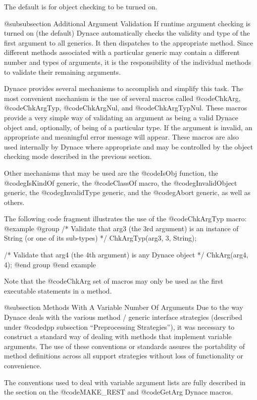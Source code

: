 The default is for object checking to be turned on.


@subsubsection Additional Argument Validation
If runtime argument checking is turned on (the default) Dynace
automatically checks the validity and type of the first argument to all
generics.  It then dispatches to the appropriate method.  Since
different methods associated with a particular generic may contain a
different number and types of arguments, it is the responsibility of the
individual methods to validate their remaining arguments.

Dynace provides several mechanisms to accomplish and simplify this task.
The most convenient mechanism is the use of several macros called
@code{ChkArg}, @code{ChkArgTyp}, @code{ChkArgNul}, and
@code{ChkArgTypNul}.  These macros provide a very simple way of
validating an argument as being a valid Dynace object and, optionally,
of being of a particular type.  If the argument is invalid, an
appropriate and meaningful error message will appear.  These macros are
also used internally by Dynace where appropriate and may be controlled
by the object checking mode described in the previous section.

Other mechanisms that may be used are the @code{IsObj} function, the
@code{gIsKindOf} generic, the @code{ClassOf} macro, the
@code{gInvalidObject} generic, the @code{gInvalidType} generic, and the
@code{gAbort} generic, as well as others.

The following code fragment illustrates the use of the @code{ChkArgTyp}
macro:
@example
@group
/*  Validate that arg3 (the 3rd argument) is an instance of String
    (or one of its sub-types)  */
ChkArgTyp(arg3, 3, String);

/*  Validate that arg4 (the 4th argument) is any Dynace object  */
ChkArg(arg4, 4);
@end group
@end example


Note that the @code{ChkArg} set of macros may only be used as the first
executable statements in a method.

@subsection Methods With A Variable Number Of Arguments
Due to the way Dynace deals with the various method / generic interface
strategies (described under @code{dpp} subsection ``Preprocessing
Strategies''), it was necessary to construct a standard way of dealing
with methods that implement variable arguments.  The use of these
conventions or standards assures the portability of method definitions
across all support strategies without loss of functionality or
convenience.

The conventions used to deal with variable argument lists are fully
described in the section on the @code{MAKE_REST} and @code{GetArg}
Dynace macros.

